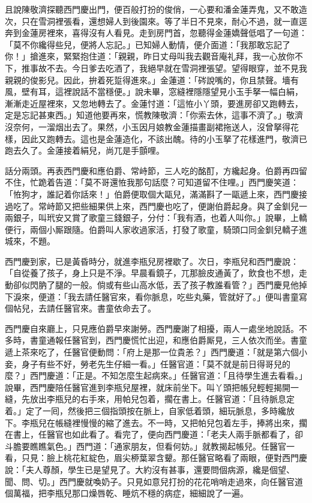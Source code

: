 且說陳敬濟探聽西門慶出門，便百般打扮的俊俏，一心要和潘金蓮弄鬼，又不敢造次，只在雪洞裡張看，還想婦人到後園來。等了半日不見來，耐心不過，就一直逕奔到金蓮房裡來，喜得沒有人看見。走到房門首，忽聽得金蓮嬌聲低唱了一句道：「莫不你纔得些兒，便將人忘記。」{}已知婦人動情，便介面道：「我那敢忘記了你！」搶進來，緊緊抱住道：「親親，昨日丈母叫我去觀音庵礼拜，我一心放你不下，推事故不去。今日爹去吃酒了，我絕早就在雪洞裡張望。望得眼穿，並不見我親親的俊影兒。{}因此，拚着死踅得進來。」金蓮道：「硶說嘴的，你且禁聲。墻有風，壁有耳，這裡說話不當穩便。」說未畢，窓縫裡隱隱望見小玉手拏一幅白絹，漸漸走近屋裡來，又忽地轉去了。金蓮忖道：「這恠小丫頭，要進房卻又跑轉去，定是忘記甚東西。」知道他要再來，慌教陳敬濟：「你索去休，這事不濟了。」敬濟沒奈何，一溜烟出去了。{}果然，小玉因月娘教金蓮描畫副裙拖送人，沒曾拏得花樣，因此又跑轉去。這也是金蓮造化，不該出醜。待的小玉拏了花樣進門，敬濟已跑去久了。金蓮接着絹兒，尚兀是手顫哩。

話分兩頭。再表西門慶和應伯爵、常峙節，三人吃的酩酊，方纔起身。伯爵再四留不住，忙跪着告道：「莫不哥還恠我那句話麼？可知道留不住哩。」西門慶笑道：「恠狗才，誰記着你話來！」伯爵便取個大甌兒，滿滿斟了一甌遞上來，西門慶接過吃了。常峙節又把些細果供上來，西門慶也吃了，便謝伯爵起身。與了金釧兒一兩銀子，叫玳安又賞了歌童三錢銀子，分付：「我有酒，也着人叫你。」說畢，上轎便行，兩個小厮跟隨。伯爵叫人家收過家活，打發了歌童，騎頭口同金釧兒轎子進城來，不題。

西門慶到家，已是黃昏時分，就進李瓶兒房裡歇了。次日，李瓶兒和西門慶說：「自從養了孩子，身上只是不淨。早晨看鏡子，兀那臉皮通黃了，飲食也不想，走動卻似閃肭了腿的一般。倘或有些山高水低，丟了孩子教誰看管？」西門慶見他掉下淚來，便道：「我去請任醫官來，看你脈息，吃些丸藥，管就好了。」便叫書童寫個帖兒，去請任醫官來。書童依命去了。

西門慶自來廳上，只見應伯爵早來謝勞。西門慶謝了相擾，兩人一處坐地說話。不多時，書童通報任醫官到，西門慶慌忙出迎，和應伯爵厮見，三人依次而坐。書童遞上茶來吃了，任醫官便動問：「府上是那一位貴恙？」西門慶道：「就是第六個小妾，身子有些不好，勞老先生仔細一看。」任醫官道：「莫不就是前日得哥兒的麼？」西門慶道：「正是。不知怎麼生起病來。」任醫官道：「且待學生進去看看。」說畢，西門慶陪任醫官進到李瓶兒屋裡，就床前坐下。叫丫頭把帳兒輕輕揭開一縫，先放出李瓶兒的右手來，用帕兒包着，擱在書上。任醫官道：「且待脈息定着。」定了一囘，然後把三個指頭按在脈上，{}自家低着頭，細玩脈息，{}多時纔放下。李瓶兒在帳縫裡慢慢的縮了進去。不一時，又把帕兒包着左手，捧將出來，擱在書上，任醫官也如此看了。看完了，便向西門慶道：「老夫人兩手脈都看了，卻斗膽要瞧瞧氣色。」西門道：「通家朋友，但看何妨。」就教揭起帳兒。{}任醫官一看，只見：臉上桃花紅綻色，眉尖桺葉翠含顰。那任醫官略看了兩眼，便對西門慶說：「夫人尊顏，學生已是望見了。大約沒有甚事，還要問個病源，纔是個望、聞、問、切。」西門慶就喚奶子。只見如意兒打扮的花花哨哨走過來，向任醫官道個萬福，把李瓶兒那口燥唇乾、睡炕不穩的病症，細細說了一遍。

